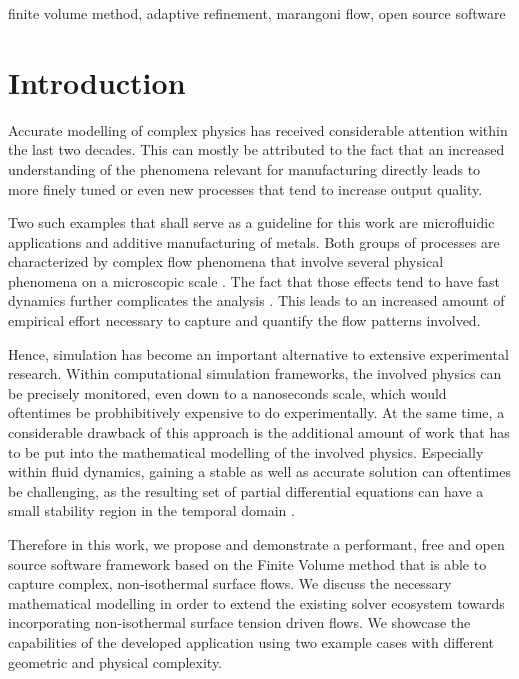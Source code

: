 \documentclass[conference,final,a4paper]{IEEEtran}
\begin{document}
\begin{IEEEkeywords}
finite volume method, adaptive refinement, marangoni flow, open source software
\end{IEEEkeywords}

\section{Introduction}

Accurate modelling of complex physics has received considerable attention within the last two decades.
This can mostly be attributed to the fact that an increased understanding of the phenomena relevant for manufacturing directly leads to more finely tuned or even new processes that tend to increase output quality.

Two such examples that shall serve as a guideline for this work are microfluidic applications and additive manufacturing of metals.
Both groups of processes are characterized by complex flow phenomena that involve several physical phenomena on a microscopic scale \cite{sackmannPresentFutureRole2014,debroyAdditiveManufacturingMetallic2018}. The fact that those effects tend to have fast dynamics further complicates the analysis \cite{khairallahControllingInterdependentMesonanosecond2020}. This leads to an increased amount of empirical effort necessary to capture and quantify the flow patterns involved.

Hence, simulation has become an important alternative to extensive experimental research. Within computational simulation frameworks, the involved physics can be precisely monitored, even down to a nanoseconds scale, which would oftentimes be probhibitively expensive to do experimentally. At the same time, a considerable drawback of this approach is the additional amount of work that has to be put into the mathematical modelling of the involved physics. Especially within fluid dynamics, gaining a stable as well as accurate solution can oftentimes be challenging, as the resulting set of partial differential equations can have a small stability region in the temporal domain \cite{laxStabilityDifferenceSchemes2013}.

Therefore in this work, we propose and demonstrate a performant, free and open source software framework based on the Finite Volume method that is able to capture complex, non-isothermal surface flows. We discuss the necessary mathematical modelling in order to extend the existing solver ecosystem towards incorporating non-isothermal surface tension driven flows. We showcase the capabilities of the developed application using two example cases with different geometric and physical complexity.
\end{document}
